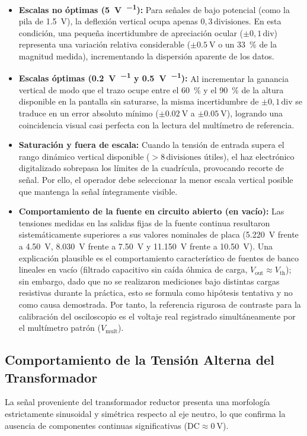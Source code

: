 \begin{itemize}
    \item \textbf{Escalas no óptimas (\qty{5}{\volt\per\division}):} Para señales de bajo potencial (como la pila de \qty{1,5}{\volt}), la deflexión vertical ocupa apenas $0{,}3\,\text{divisiones}$. En esta condición, una pequeña incertidumbre de apreciación ocular ($\pm 0{,}1\,\text{div}$) representa una variación relativa considerable ($\pm\qty{0,5}{\volt}$ o un \qty{33}{\percent} de la magnitud medida), incrementando la dispersión aparente de los datos.
    \item \textbf{Escalas óptimas (\qty{0,2}{\volt\per\division} y \qty{0,5}{\volt\per\division}):} Al incrementar la ganancia vertical de modo que el trazo ocupe entre el \qty{60}{\percent} y el \qty{90}{\percent} de la altura disponible en la pantalla sin saturarse, la misma incertidumbre de $\pm 0{,}1\,\text{div}$ se traduce en un error absoluto mínimo ($\pm\qty{0,02}{\volt}$ a $\pm\qty{0,05}{\volt}$), logrando una coincidencia visual casi perfecta con la lectura del multímetro de referencia.
    \item \textbf{Saturación y fuera de escala:} Cuando la tensión de entrada supera el rango dinámico vertical disponible ($> 8\,\text{divisiones}$ útiles), el haz electrónico digitalizado sobrepasa los límites de la cuadrícula, provocando recorte de señal. Por ello, el operador debe seleccionar la menor escala vertical posible que mantenga la señal íntegramente visible.
    \item \textbf{Comportamiento de la fuente en circuito abierto (en vacío):} Las tensiones medidas en las salidas fijas de la fuente continua resultaron sistemáticamente superiores a sus valores nominales de placa (\qty{5,220}{\volt} frente a \qty{4,50}{\volt}, \qty{8,030}{\volt} frente a \qty{7,50}{\volt} y \qty{11,150}{\volt} frente a \qty{10,50}{\volt}). Una explicación plausible es el comportamiento característico de fuentes de banco lineales en vacío (filtrado capacitivo sin caída óhmica de carga, $V_{\text{out}} \approx V_{\text{th}}$); sin embargo, dado que no se realizaron mediciones bajo distintas cargas resistivas durante la práctica, esto se formula como hipótesis tentativa y no como causa demostrada. Por tanto, la referencia rigurosa de contraste para la calibración del osciloscopio es el voltaje real registrado simultáneamente por el multímetro patrón ($V_{\text{mult}}$).
\end{itemize}

\subsection{Comportamiento de la Tensión Alterna del Transformador}
La señal proveniente del transformador reductor presenta una morfología estrictamente sinusoidal y simétrica respecto al eje neutro, lo que confirma la ausencia de componentes continuas significativas ($\text{DC} \approx \qty{0}{\volt}$).

